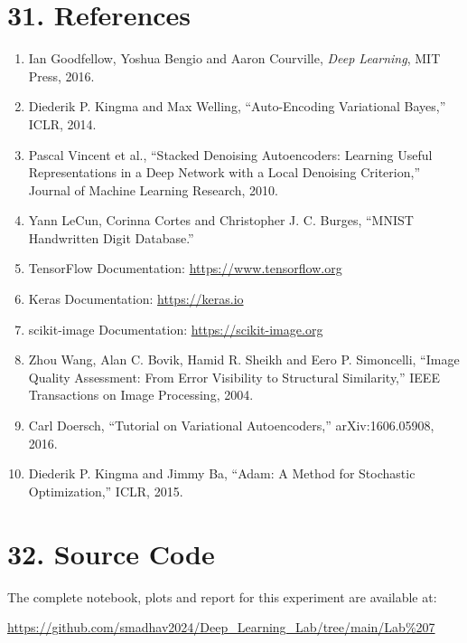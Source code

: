 \documentclass[10pt]{article}
\begin{document}
\section*{31. References}

\begin{enumerate}
\item Ian Goodfellow, Yoshua Bengio and Aaron Courville,
\emph{Deep Learning}, MIT Press, 2016.

\item Diederik P. Kingma and Max Welling,
``Auto-Encoding Variational Bayes,'' ICLR, 2014.

\item Pascal Vincent et al.,
``Stacked Denoising Autoencoders: Learning Useful Representations in a Deep
Network with a Local Denoising Criterion,'' Journal of Machine Learning
Research, 2010.

\item Yann LeCun, Corinna Cortes and Christopher J. C. Burges,
``MNIST Handwritten Digit Database.''

\item TensorFlow Documentation:
\url{https://www.tensorflow.org}

\item Keras Documentation:
\url{https://keras.io}

\item scikit-image Documentation:
\url{https://scikit-image.org}

\item Zhou Wang, Alan C. Bovik, Hamid R. Sheikh and Eero P. Simoncelli,
``Image Quality Assessment: From Error Visibility to Structural Similarity,''
IEEE Transactions on Image Processing, 2004.

\item Carl Doersch, ``Tutorial on Variational Autoencoders,'' arXiv:1606.05908, 2016.

\item Diederik P. Kingma and Jimmy Ba, ``Adam: A Method for Stochastic Optimization,''
ICLR, 2015.
\end{enumerate}

\section*{32. Source Code}

The complete notebook, plots and report for this experiment are available at:

\url{https://github.com/smadhav2024/Deep_Learning_Lab/tree/main/Lab%207}
\end{document}
